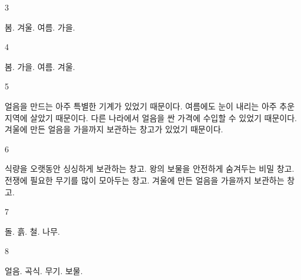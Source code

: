 \documentclass[fs9,seriesFre]{korfarm-base}
\begin{document}
\begin{kfSentenceUnit}{3}{}
\begin{kfChoices}
\kfChoice 봄.
\kfChoice 겨울.
\kfChoice 여름.
\kfChoice 가을.
\end{kfChoices}
\end{kfSentenceUnit}

\begin{kfSentenceUnit}{4}{}
\begin{kfChoices}
\kfChoice 봄.
\kfChoice 가을.
\kfChoice 여름.
\kfChoice 겨울.
\end{kfChoices}
\end{kfSentenceUnit}

\begin{kfSentenceUnit}{5}{}
\begin{kfChoices}
\kfChoice 얼음을 만드는 아주 특별한 기계가 있었기 때문이다.
\kfChoice 여름에도 눈이 내리는 아주 추운 지역에 살았기 때문이다.
\kfChoice 다른 나라에서 얼음을 싼 가격에 수입할 수 있었기 때문이다.
\kfChoice 겨울에 만든 얼음을 가을까지 보관하는 창고가 있었기 때문이다.
\end{kfChoices}
\end{kfSentenceUnit}

\begin{kfSentenceUnit}{6}{}
\begin{kfChoices}
\kfChoice 식량을 오랫동안 싱싱하게 보관하는 창고.
\kfChoice 왕의 보물을 안전하게 숨겨두는 비밀 창고.
\kfChoice 전쟁에 필요한 무기를 많이 모아두는 창고.
\kfChoice 겨울에 만든 얼음을 가을까지 보관하는 창고.
\end{kfChoices}
\end{kfSentenceUnit}

\begin{kfSentenceUnit}{7}{}
\begin{kfChoices}
\kfChoice 돌.
\kfChoice 흙.
\kfChoice 철.
\kfChoice 나무.
\end{kfChoices}
\end{kfSentenceUnit}

\begin{kfSentenceUnit}{8}{}
\begin{kfChoices}
\kfChoice 얼음.
\kfChoice 곡식.
\kfChoice 무기.
\kfChoice 보물.
\end{kfChoices}
\end{kfSentenceUnit}
\end{document}
